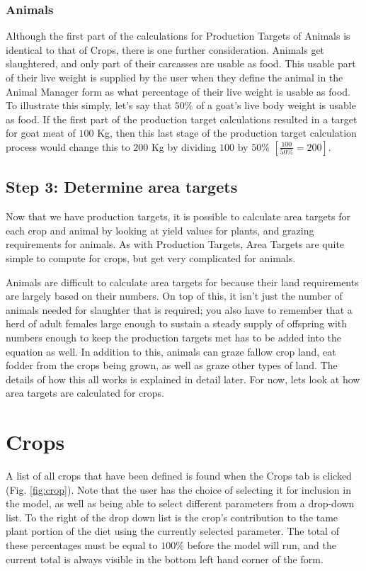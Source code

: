   \subsubsection{Animals}
  Although the first part of the calculations for Production Targets of Animals is identical to that of Crops, there is one further consideration.  Animals get slaughtered, and only part of their carcasses are usable as food.  This usable part of their live weight is supplied by the user when they define the animal in the Animal Manager form as what percentage of their live weight is usable as food.  To illustrate this simply, let's say that $50\%$ of a goat's live body weight is usable as food.  If the first part of the production target calculations resulted in a target for goat meat of $100$ Kg, then this last stage of the production target calculation process would change this to $200$ Kg by dividing $100$ by $50\%$   $\left[ \frac{100}{50\%}=200\right]$.

\subsection{Step 3: Determine area targets}
Now that we have production targets, it is possible to calculate area targets for each crop and animal by looking at yield values for plants, and grazing requirements for animals.  As with Production Targets, Area Targets are quite simple to compute for crops, but get very complicated for animals.

Animals are difficult to calculate area targets for because their land requirements are largely based on their numbers.  On top of this, it isn't just the number of animals needed for slaughter that is required; you also have to remember that a herd of adult females large enough to sustain a steady supply of offspring with numbers enough to keep the production targets met has to be added into the equation as well.  In addition to this, animals can graze fallow crop land, eat fodder from the crops being grown, as well as graze other types of land.  The details of how this all works is explained in detail later.  For now, lets look at how area targets are calculated for crops.

  \section{Crops}
    A list of all crops that have been defined is found when the Crops tab is clicked (Fig. \ref{fig:crop}).  Note that the user has the
choice of selecting it for inclusion in the model, as well as being able to select different parameters from a drop-down list.  To the
right of the drop down list is the crop's contribution to the tame plant portion of the diet using the currently selected parameter.  The total of these percentages must be equal to $100\%$ before the model will run, and the current total is always visible in the bottom left
hand corner of the form.

